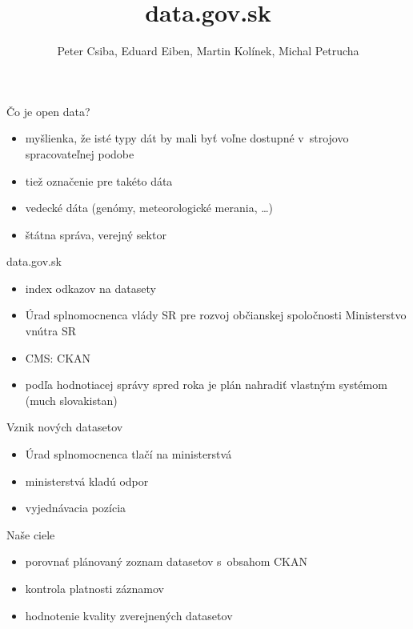 \documentclass[slovak,14pt,utf8]{beamer}
\title{data.gov.sk}
\author[Csiba, Eiben, Kolínek, Petrucha]{Peter Csiba, Eduard Eiben, Martin
Kolínek, Michal Petrucha}
\institute{FMFI UK}
\date{\year}
\begin{document}
\begin{frame}{}
    \titlepage
\end{frame}

\begin{frame}{Čo je open data?}
    \begin{itemize}
        \item myšlienka, že isté typy dát by mali byť voľne dostupné
              v~strojovo spracovateľnej podobe
        \item tiež označenie pre takéto dáta
        \item vedecké dáta (genómy, meteorologické merania, \dots)
        \item štátna správa, verejný sektor
    \end{itemize}
\end{frame}

\begin{frame}{data.gov.sk}
    \begin{itemize}
        \item index odkazov na datasety
        \item Úrad splnomocnenca vlády SR pre rozvoj občianskej spoločnosti Ministerstvo vnútra SR
        \item CMS: CKAN
        \item podľa hodnotiacej správy spred roka je plán nahradiť vlastným systémom (much slovakistan)
    \end{itemize}
\end{frame}

\begin{frame}{Vznik nových datasetov}
    \begin{itemize}
        \item Úrad splnomocnenca tlačí na ministerstvá
        \item ministerstvá kladú odpor
        \item vyjednávacia pozícia
    \end{itemize}
\end{frame}

\begin{frame}{Naše ciele}
    \begin{itemize}
        \item porovnať plánovaný zoznam datasetov s~obsahom CKAN
        \item kontrola platnosti záznamov
        \item hodnotenie kvality zverejnených datasetov
    \end{itemize}
\end{frame}
\end{document}
